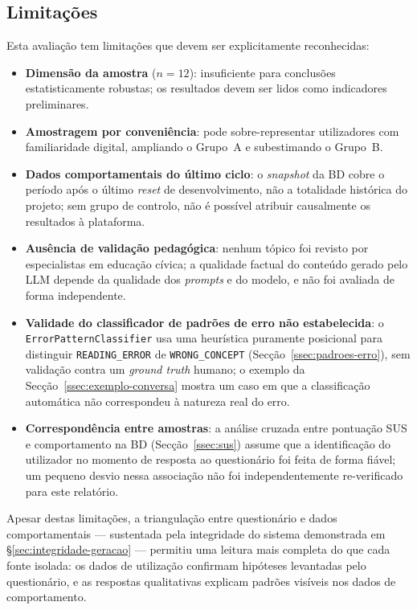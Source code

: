 \subsection{Limitações}
\label{ssec:discussao-f2}

Esta avaliação tem limitações que devem ser explicitamente reconhecidas:

\begin{itemize}
	\item \textbf{Dimensão da amostra} ($n=12$): insuficiente para conclusões estatisticamente robustas; os resultados devem ser lidos como indicadores preliminares.
	\item \textbf{Amostragem por conveniência}: pode sobre-representar utilizadores com familiaridade digital, ampliando o Grupo~A e subestimando o Grupo~B.
	\item \textbf{Dados comportamentais do último ciclo}: o \emph{snapshot} da BD cobre o período após o último \emph{reset} de desenvolvimento, não a totalidade histórica do projeto; sem grupo de controlo, não é possível atribuir causalmente os resultados à plataforma.
	\item \textbf{Ausência de validação pedagógica}: nenhum tópico foi revisto por especialistas em educação cívica; a qualidade factual do conteúdo gerado pelo LLM depende da qualidade dos \emph{prompts} e do modelo, e não foi avaliada de forma independente.
	\item \textbf{Validade do classificador de padrões de erro não estabelecida}: o \texttt{ErrorPatternClassifier} usa uma heurística puramente posicional para distinguir \texttt{READING\_ERROR} de \texttt{WRONG\_CONCEPT} (Secção~\ref{ssec:padroes-erro}), sem validação contra um \emph{ground truth} humano; o exemplo da Secção~\ref{ssec:exemplo-conversa} mostra um caso em que a classificação automática não correspondeu à natureza real do erro.
	\item \textbf{Correspondência entre amostras}: a análise cruzada entre pontuação SUS e comportamento na BD (Secção~\ref{ssec:sus}) assume que a identificação do utilizador no momento de resposta ao questionário foi feita de forma fiável; um pequeno desvio nessa associação não foi independentemente re-verificado para este relatório.
\end{itemize}

Apesar destas limitações, a triangulação entre questionário e dados comportamentais --- sustentada pela integridade do sistema demonstrada em §\ref{sec:integridade-geracao} --- permitiu uma leitura mais completa do que cada fonte isolada: os dados de utilização confirmam hipóteses levantadas pelo questionário, e as respostas qualitativas explicam padrões visíveis nos dados de comportamento.
